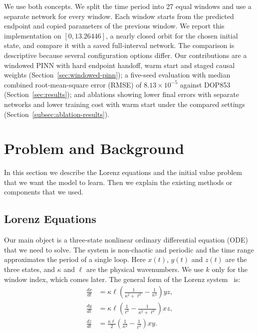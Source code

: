 \documentclass[conference,a4paper]{IEEEtran}
\begin{document}
We use both concepts. We split the time period into 27 equal windows and use a separate network for every window. Each window starts from the predicted endpoint and copied parameters of the previous window. We report this implementation on $[0,13.26446]$, a nearly closed orbit for the chosen initial state, and compare it with a saved full-interval network. The comparison is descriptive because several configuration options differ. Our contributions are a windowed PINN with hard endpoint handoff, warm start and staged causal weights (Section~\ref{sec:windowed-pinn}); a five-seed evaluation with median combined root-mean-square error (RMSE) of $8.13\times10^{-5}$ against DOP853 (Section~\ref{sec:results}); and ablations showing lower final errors with separate networks and lower training cost with warm start under the compared settings (Section~\ref{subsec:ablation-results}).



\section{Problem and Background}
In this section we describe the Lorenz equations and the initial value problem that we want the model to learn. Then we explain the existing methods or components that we used.

\subsection{Lorenz Equations}
Our main object is a three-state nonlinear ordinary differential equation (ODE) that we need to solve. The system is non-chaotic and periodic and the time range approximates the period of a single loop.  Here $x(t)$, $y(t)$ and $z(t)$ are the three states, and $\kappa$ and $\ell$ are the physical wavenumbers. We use $k$ only for the window index, which comes later. The general form of the Lorenz system~\cite{lorenz1960} is:
\begin{equation}
\begin{aligned}
\frac{dx}{dt}
  &= \kappa\ell
     \left(\frac{1}{\kappa^2+\ell^2}
           -\frac{1}{\kappa^2}\right)yz,\\
\frac{dy}{dt}
  &= \kappa\ell
     \left(\frac{1}{\ell^2}
           -\frac{1}{\kappa^2+\ell^2}\right)xz,\\
\frac{dz}{dt}
  &= \frac{\kappa\ell}{2}
     \left(\frac{1}{\kappa^2}
           -\frac{1}{\ell^2}\right)xy.
\end{aligned}
\label{eq:lorenz1960}
\end{equation}
\end{document}

